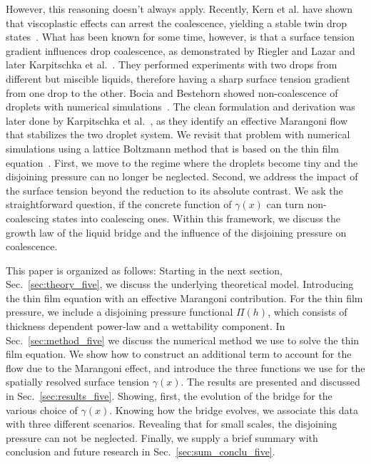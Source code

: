 However, this reasoning doesn't always apply. 
Recently, Kern et al. have shown that viscoplastic effects can arrest the coalescence, yielding a stable twin drop states~\cite{PhysRevFluids.7.L081601}.
What has been known for some time, however, is that a surface tension gradient influences drop coalescence, as demonstrated by Riegler and Lazar and later Karpitschka et al.~\cite{PhysRevLett.109.066103, doi:10.1021/la500459v, karpitschka2014sharp, bruning2018delayed}.
They performed experiments with two drops from different but miscible liquids, therefore having a sharp surface tension gradient from one drop to the other.
Bocia and Bestehorn showed non-coalescence of droplets with numerical simulations~\cite{PhysRevE.82.036312, borcia2011coalescence}.
The clean formulation and derivation was later done by Karpitschka et al.~\cite{PhysRevLett.109.066103}, as they identify an effective Marangoni flow that stabilizes the two droplet system.
We revisit that problem with numerical simulations using a lattice Boltzmann method that is based on the thin film equation~\cite{zitzLatticeBoltzmannMethod2019}.
First, we move to the regime where the droplets become tiny and the disjoining pressure can no longer be neglected.
Second, we address the impact of the surface tension beyond the reduction to its absolute contrast.
We ask the straightforward question, if the concrete function of $\gamma(x)$ can turn non-coalescing states into coalescing ones.
Within this framework, we discuss the growth law of the liquid bridge and the influence of the disjoining pressure on coalescence.

This paper is organized as follows:
Starting in the next section, Sec.~\ref{sec:theory_five}, we discuss the underlying theoretical model.
Introducing the thin film equation with an effective Marangoni contribution. 
For the thin film pressure, we include a disjoining pressure functional $\Pi(h)$, which consists of thickness dependent power-law and a wettability component. 
In Sec.~\ref{sec:method_five} we discuss the numerical method we use to solve the thin film equation.
We show how to construct an additional term to account for the flow due to the Marangoni effect, and
introduce the three functions we use for the spatially resolved surface tension $\gamma(x)$. 
The results are presented and discussed in Sec.~\ref{sec:results_five}.
Showing, first, the evolution of the bridge for the various choice of $\gamma(x)$.
Knowing how the bridge evolves, we associate this data with three different scenarios.
Revealing that for small scales, the disjoining pressure can not be neglected.
Finally, we supply a brief summary with conclusion and future research in Sec.~\ref{sec:sum_conclu_five}. 

